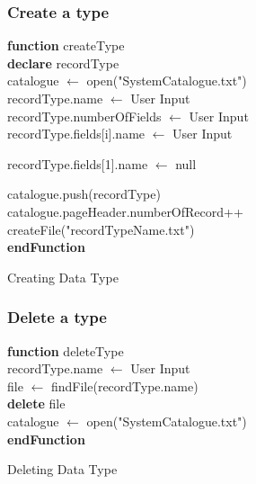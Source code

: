 \documentclass{article}
\begin{document}
        \subsubsection{Create a type}
        
        
        \begin{algorithm}[H]
\DontPrintSemicolon
\textbf{function} createType \\
\textbf{declare} recordType \\
catalogue $\leftarrow$ open("SystemCatalogue.txt") \\
recordType.name $\leftarrow$ User Input \\
recordType.numberOfFields $\leftarrow$ User Input \\
  
        { 
        	recordType.fields[i].name $\leftarrow$ User Input
        }
  
  
    {
       
        
        { 
        	recordType.fields[1].name $\leftarrow$ null 
        }
    }
    catalogue.push(recordType) \\
    catalogue.pageHeader.numberOfRecord++ \\
    createFile("recordTypeName.txt") \\
\textbf{endFunction} 
   

\caption{Creating Data Type}
\end{algorithm}
        
        \subsubsection{Delete a type}
                \begin{algorithm}[H]
\DontPrintSemicolon
\textbf{function} deleteType \\
recordType.name $\leftarrow$ User Input  \\
file $\leftarrow$ findFile(recordType.name)  \\
\textbf{delete} file \\
catalogue $\leftarrow$ open("SystemCatalogue.txt") \\
\textbf{endFunction} 
\caption{Deleting Data Type}
\end{algorithm}
\end{document}
